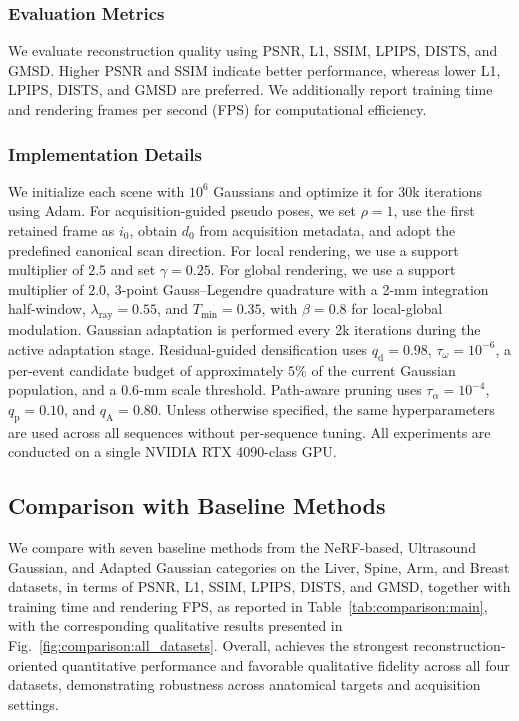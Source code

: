 \subsubsection{Evaluation Metrics}
\label{sec:experiments:metrics}

We evaluate reconstruction quality using PSNR, L1, SSIM, LPIPS, DISTS, and
GMSD. Higher PSNR and SSIM indicate better performance, whereas lower L1,
LPIPS, DISTS, and GMSD are preferred. We additionally report training time and
rendering frames per second (FPS) for computational efficiency.

\subsubsection{Implementation Details}
\label{sec:experiments:implementation}

We initialize each scene with $10^6$ Gaussians and optimize it for 30k
iterations using Adam. For acquisition-guided pseudo poses, we set $\rho=1$,
use the first retained frame as $i_0$, obtain $d_0$ from acquisition metadata,
and adopt the predefined canonical scan direction. For local rendering, we use
a support multiplier of $2.5$ and set $\gamma=0.25$. For global rendering, we
use a support multiplier of $2.0$, 3-point Gauss--Legendre quadrature with a
2-mm integration half-window, $\lambda_{\mathrm{ray}}=0.55$, and
$T_{\min}=0.35$, with $\beta=0.8$ for local-global modulation. Gaussian
adaptation is performed every 2k iterations during the active adaptation stage.
Residual-guided densification uses $q_{\mathrm d}=0.98$,
$\tau_{\omega}=10^{-6}$, a per-event candidate budget of approximately $5\%$
of the current Gaussian population, and a $0.6$-mm scale threshold.
Path-aware pruning uses $\tau_{\alpha}=10^{-4}$, $q_{\mathrm p}=0.10$, and
$q_{\mathrm A}=0.80$. Unless otherwise specified, the same hyperparameters are
used across all sequences without per-sequence tuning. All experiments are
conducted on a single NVIDIA RTX 4090-class GPU.



\vspace{-3mm}
\subsection{Comparison with Baseline Methods}
\label{sec:results:comparison}

We compare \methodname{} with seven baseline methods from the NeRF-based,
Ultrasound Gaussian, and Adapted Gaussian categories on the Liver, Spine, Arm,
and Breast datasets, in terms of PSNR, L1, SSIM, LPIPS, DISTS, and GMSD,
together with training time and rendering FPS, as reported in
Table~\ref{tab:comparison:main}, with the corresponding qualitative results
presented in Fig.~\ref{fig:comparison:all_datasets}.
Overall, \methodname{} achieves the strongest reconstruction-oriented
quantitative performance and favorable qualitative fidelity across all four
datasets, demonstrating robustness across anatomical targets and acquisition
settings.

